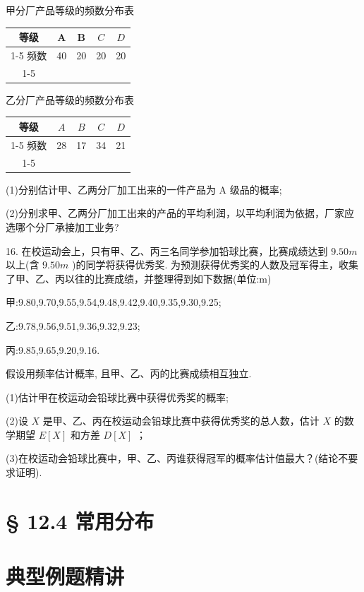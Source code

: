 甲分厂产品等级的频数分布表

\begin{center}
\begin{tabular}{|c|c|c|c|c|}
\hline
等级 & A & B & $C$ & $D$ \\
\cline{1-5}
频数 & 40 & 20 & 20 & 20 \\
\cline{1-5}
\hline
\end{tabular}
\end{center}

乙分厂产品等级的频数分布表

\begin{center}
\begin{tabular}{|c|c|c|c|c|}
\hline
等级 & $A$ & $B$ & $C$ & $D$ \\
\cline{1-5}
频数 & 28 & 17 & 34 & 21 \\
\cline{1-5}
\hline
\end{tabular}
\end{center}

(1)分别估计甲、乙两分厂加工出来的一件产品为 A 级品的概率;

(2)分别求甲、乙两分厂加工出来的产品的平均利润，以平均利润为依据，厂家应选哪个分厂承接加工业务?

16. 在校运动会上，只有甲、乙、丙三名同学参加铅球比赛，比赛成绩达到 ${9.50}{m}$ 以上(含 ${9.50}{m}$ )的同学将获得优秀奖. 为预测获得优秀奖的人数及冠军得主，收集了甲、乙、丙以往的比赛成绩，并整理得到如下数据(单位:m)

甲:9.80,9.70,9.55,9.54,9.48,9.42,9.40,9.35,9.30,9.25;

乙:9.78,9.56,9.51,9.36,9.32,9.23;

丙:9.85,9.65,9.20,9.16.

假设用频率估计概率, 且甲、乙、丙的比赛成绩相互独立.

(1)估计甲在校运动会铅球比赛中获得优秀奖的概率;

(2)设 $X$ 是甲、乙、丙在校运动会铅球比赛中获得优秀奖的总人数，估计 $X$ 的数学期望 $E\left\lbrack  X\right\rbrack$ 和方差 $D\left\lbrack  X\right\rbrack$ ；

(3)在校运动会铅球比赛中，甲、乙、丙谁获得冠军的概率估计值最大？(结论不要求证明).

\section*{§ 12.4 常用分布}

\section*{典型例题精讲}

